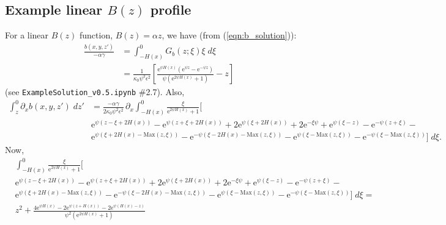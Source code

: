 \documentclass[10pt]{amsart}
\begin{document}
\subsection{Example linear $B(z)$ profile}
\label{sect:linear_B_profile}
For a linear $B(z)$ function, $B(z) = \alpha z$, we have (from (\ref{eqn:b_solution})):
\begin{align}
\frac{ b(x,y,z')}{- \alpha \gamma } & = \int_{-H(x)}^{0} G_b(z; \xi) \xi \; d \xi \nonumber \\
 & =  
 \frac{1}{\kappa_0 \psi^{2} \epsilon^{2} }
 \left[
\frac{ \mathrm{e}^{\psi H(x)} \left( \mathrm{e}^{\psi   z }  -  \mathrm{e}^{- \psi z } \right) }{\psi \left(  \mathrm{e}^{2 \psi H(x)} + 1 \right)} - z
\right]
\end{align}
(see \texttt{ExampleSolution\_v0.5.ipynb} \#2.7).
Also,
\begin{align}
 \int_{z}^{0} \partial_x b(x,y,z') \; dz' 
 & = \frac{- \alpha  \gamma}{2 \kappa_0  \psi^{2} \epsilon^{2}} \,  \partial_x  \int_{-H(x)}^{0} 
\frac{ \xi}{  \mathrm{e}^{2 \psi H\left( x \right)} + 1  }\bigg[ \nonumber \\
& \mathrm{e}^{\psi \left( z  - \xi + 2  H(x)\right)} -
 \mathrm{e}^{\psi \left( z + \xi + 2 H(x)\right)} +
2 \mathrm{e}^{\psi \left( \xi + 2  H(x) \right) } + 
2 \mathrm{e}^{ - \xi \psi} +  
\mathrm{e}^{  \psi \left(  \xi - z \right)} - 
\mathrm{e}^{ - \psi \left( z + \xi \right)} - \nonumber \\
& \mathrm{e}^{ \psi \left( \xi + 2  H(x) -  \mathrm{Max}\left( z, \xi \right)\right)} - 
\mathrm{e}^{ - \psi \left( \xi - 2  H(x) -  \mathrm{Max}\left( z, \xi \right) \right)} -
\mathrm{e}^{ \psi \left( \xi  -  \mathrm{Max}\left( z, \xi \right) \right)} - 
 \mathrm{e}^{ - \psi \left( \xi - \mathrm{Max}\left( z, \xi \right) \right)} 
\bigg]
 \; d \xi \nonumber .
 \end{align}
Now, 
\begin{align}
&\int_{-H(x)}^{0} 
\frac{ \xi}{  \mathrm{e}^{2 \psi H\left( x \right)} + 1  }\bigg[ \nonumber \\
& \mathrm{e}^{\psi \left( z  - \xi + 2  H(x)\right)} -
 \mathrm{e}^{\psi \left( z + \xi + 2 H(x)\right)} +
2 \mathrm{e}^{\psi \left( \xi + 2  H(x) \right) } + 
2 \mathrm{e}^{ - \xi \psi} +  
\mathrm{e}^{  \psi \left(  \xi - z \right)} - 
\mathrm{e}^{ - \psi \left( z + \xi \right)} - \nonumber \\
& \mathrm{e}^{ \psi \left( \xi + 2  H(x) -  \mathrm{Max}\left( z, \xi \right)\right)} - 
\mathrm{e}^{ - \psi \left( \xi - 2  H(x) -  \mathrm{Max}\left( z, \xi \right) \right)} -
\mathrm{e}^{ \psi \left( \xi  -  \mathrm{Max}\left( z, \xi \right) \right)} - 
 \mathrm{e}^{ - \psi \left( \xi - \mathrm{Max}\left( z, \xi \right) \right)} 
\bigg]
 \; d \xi  = \nonumber \\
& z^2 + \frac{ 4 \mathrm{e}^{ \psi  H(x)} 
- 2 \mathrm{e}^{ \psi \left(  z + H(x) \right)} 
- 2 \mathrm{e}^{ \psi \left(  H(x) - z \right)} }{  \psi^{2}  \left( \mathrm{e}^{2  \psi H(x)} + 1 \right)}  \nonumber
 \end{align}
\end{document}
